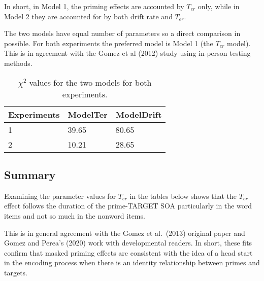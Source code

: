 \begin{appendix}
In short, in Model 1, the priming effects are accounted by \(T_{er}\)
only, while in Model 2 they are accounted for by both drift rate and
\(T_{er}\).

The two models have equal number of parameters so a direct comparison in
possible. For both experiments the preferred model is Model 1 (the
\(T_{er}\) model). This is in agreement with the Gomez et al (2012)
study using in-person testing methods.

\begin{table}[tbp]

\begin{center}
\begin{threeparttable}

\caption{\label{tab:model_parameters_table}$\chi^2$ values for the two models for both experiments.}

\begin{tabular}{lll}
\toprule
Experiments & \multicolumn{1}{c}{ModelTer} & \multicolumn{1}{c}{ModelDrift}\\
\midrule
1 & 39.65 & 80.65\\
2 & 10.21 & 28.65\\
\bottomrule
\end{tabular}

\end{threeparttable}
\end{center}

\end{table}

\hypertarget{summary}{%
\subsection{Summary}\label{summary}}

Examining the parameter values for \(T_{er}\) in the tables below shows
that the \(T_{er}\) effect follows the duration of the prime-TARGET SOA
particularly in the word items and not so much in the nonword items.

This is in general agreement with the Gomez et al.~(2013) original paper
and Gomez and Perea's (2020) work with developmental readers. In short,
these fits confirm that masked priming effects are consistent with the
idea of a head start in the encoding process when there is an identity
relationship between primes and targets.

\begin{table}[tbp]

\begin{center}
\begin{threeparttable}


\end{threeparttable}
\end{center}
\end{table}
\end{appendix}
